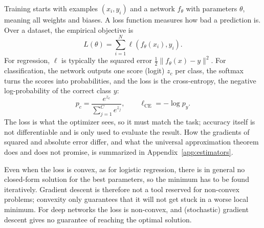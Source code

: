 Training starts with examples $(x_i,y_i)$ and a network $f_\theta$ with
parameters $\theta$, meaning all weights and biases. A loss function measures
how bad a prediction is. Over a dataset, the empirical objective is
\begin{equation}
  L(\theta) =
  \sum_{i=1}^{N} \ell\!\left(f_\theta(x_i), y_i\right).
\end{equation}
\noindent
For regression, $\ell$ is typically the squared error
$\tfrac12\lVert f_\theta(x) - y\rVert^2$. For classification, the network
outputs one score (logit) $z_c$ per class, the softmax turns the scores into
probabilities, and the loss is the cross-entropy, the negative log-probability
of the correct class $y$:
\begin{equation}
  p_c = \frac{e^{z_c}}{\sum_{j=1}^{C} e^{z_j}},
  \qquad
  \ell_{\mathrm{CE}} = -\log p_y .
\end{equation}
\noindent
The loss is what the optimizer sees, so it must match the task; accuracy itself
is not differentiable and is only used to evaluate the result. How the gradients
of squared and absolute error differ, and what the universal approximation
theorem does and does not promise, is summarized in
Appendix~\ref{app:estimators}.

Even when the loss is convex, as for logistic regression, there is in general no
closed-form solution for the best parameters, so the minimum has to be found
iteratively. Gradient descent is therefore not a tool reserved for non-convex
problems; convexity only guarantees that it will not get stuck in a worse local
minimum. For deep networks the loss is non-convex, and (stochastic) gradient
descent gives no guarantee of reaching the optimal solution.

